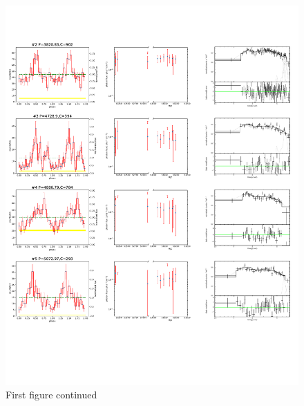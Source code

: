 \documentclass[fleqn,usenatbib]{mnras}
\begin{document}
   \begin{figure}
    \centering
    \includegraphics[page=4,scale=0.90,trim=0 100 0 20,clip]{plot_figure_LW.pdf}
    \caption{First figure continued}
  \end{figure}
  
\end{document}
